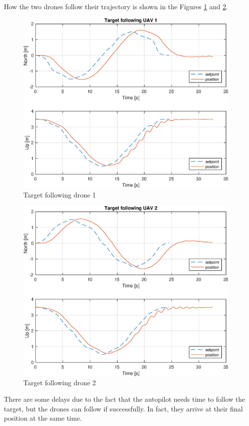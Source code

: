 How the two drones follow their trajectory is shown in the Figures
\ref{fig:following_1} and \ref{fig:following_2}.

\begin{figure}
\centering
\includegraphics[width=0.7\linewidth]{chapters/chapter-04/figures/following_1.eps}
\caption{Target following drone 1}
\label{fig:following_1}
\end{figure}

\begin{figure}
\centering
\includegraphics[width=0.7\linewidth]{chapters/chapter-04/figures/following_2.eps}
\caption{Target following drone 2}
\label{fig:following_2}
\end{figure}

There are some delays due to the fact that the autopilot needs time to follow the target,
but the drones can follow if successfully.
In fact, they arrive at their final position at the same time.

